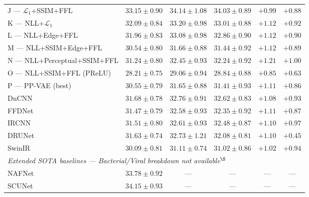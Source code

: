 \documentclass[12pt, a4paper, twoside, openright]{book}
\begin{document}
\begin{table}[htbp]
{\begin{tabular}{lccccc}
J — $\mathcal{L}_1$+SSIM+FFL                 & $33.15\pm0.90$ & $34.14\pm1.08$ & $34.03\pm0.89$ & $+0.99$ & $+0.88$ \\
K — NLL+$\mathcal{L}_1$                       & $32.09\pm0.84$ & $33.20\pm0.98$ & $33.01\pm0.88$ & $+1.12$ & $+0.92$ \\
L — NLL+Edge+FFL                              & $31.96\pm0.83$ & $33.08\pm0.98$ & $32.86\pm0.90$ & $+1.12$ & $+0.90$ \\
M — NLL+SSIM+Edge+FFL                         & $30.54\pm0.80$ & $31.66\pm0.88$ & $31.44\pm0.92$ & $+1.12$ & $+0.89$ \\
N — NLL+Perceptual+SSIM+FFL                   & $31.24\pm0.80$ & $32.45\pm0.93$ & $32.24\pm0.92$ & $+1.21$ & $+1.00$ \\
O — NLL+SSIM+FFL (PReLU)                      & $28.21\pm0.75$ & $29.06\pm0.94$ & $28.84\pm0.88$ & $+0.85$ & $+0.63$ \\
P — PP-VAE (best)                             & $30.55\pm0.79$ & $31.65\pm0.88$ & $31.41\pm0.93$ & $+1.11$ & $+0.86$ \\
\midrule
DnCNN \cite{zhang_beyond_2017}                & $31.68\pm0.78$ & $32.76\pm0.91$ & $32.62\pm0.83$ & $+1.08$ & $+0.93$ \\
FFDNet \cite{zhang_ffdnet_2018}               & $31.47\pm0.79$ & $32.58\pm0.93$ & $32.35\pm0.92$ & $+1.11$ & $+0.87$ \\
IRCNN \cite{zhang_learning_2017}              & $31.51\pm0.80$ & $32.61\pm0.93$ & $32.48\pm0.87$ & $+1.10$ & $+0.97$ \\
DRUNet \cite{zhang_plug_2021}                 & $31.63\pm0.74$ & $32.73\pm1.21$ & $32.08\pm0.81$ & $+1.10$ & $+0.45$ \\
SwinIR \cite{liang_swinir_2021}               & $30.09\pm0.81$ & $31.11\pm0.74$ & $31.02\pm0.86$ & $+1.02$ & $+0.94$ \\
\midrule
\multicolumn{6}{l}{\textit{Extended SOTA baselines — Bacterial/Viral breakdown not available$^\S$}} \\
NAFNet \cite{chen_nafnet_2022}                & $33.78\pm0.92$ & --- & --- & --- & --- \\
SCUNet \cite{zhang_scunet_2023}               & $\mathbf{34.15\pm0.93}$ & --- & --- & --- & --- \\
\bottomrule
\end{tabular}%
}
\par{}
\end{table}
\end{document}
